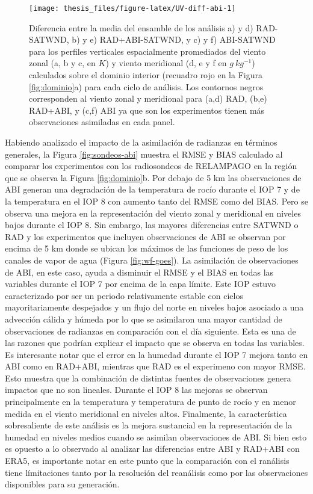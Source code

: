 \documentclass[12pt,oneside,a4paper]{reedthesis}
\begin{document}
\begin{figure}

{\centering \texttt{[image: thesis\_files/figure-latex/UV-diff-abi-1]} 

}

\caption{Diferencia entre la media del ensamble de los análisis a) y d) RAD-SATWND, b) y e) RAD+ABI-SATWND, y c) y f) ABI-SATWND para los perfiles verticales espacialmente promediados del viento zonal (a, b y c, en \(K\)) y viento meridional (d, e y f en \(g\ kg^{-1}\)) calculados sobre el dominio interior (recuadro rojo en la Figura \ref{fig:dominio}a) para cada ciclo de análisis. Los contornos negros corresponden al viento zonal y meridional para (a,d) RAD, (b,e) RAD+ABI, y (c,f) ABI ya que son los experimentos tienen más observaciones asimiladas en cada panel.}\label{fig:UV-diff-abi}
\end{figure}
Habiendo analizado el impacto de la asimilación de radianzas en términos generales, la Figura \ref{fig:sondeos-abi} muestra el RMSE y BIAS calculado al comparar los experimentos con los radiosondeos de RELAMPAGO en la región que se observa la Figura \ref{fig:dominio}b. Por debajo de 5 km las observaciones de ABI generan una degradación de la temperatura de rocío durante el IOP 7 y de la temperatura en el IOP 8 con aumento tanto del RMSE como del BIAS. Pero se observa una mejora en la representación del viento zonal y meridional en niveles bajos durante el IOP 8. Sin embargo, las mayores diferencias entre SATWND o RAD y los experimentos que incluyen observaciones de ABI se observan por encima de 5 km donde se ubican los máximos de las funciones de peso de los canales de vapor de agua (Figura \ref{fig:wf-goes}). La asimilación de observaciones de ABI, en este caso, ayuda a disminuir el RMSE y el BIAS en todas las variables durante el IOP 7 por encima de la capa límite. Este IOP estuvo caracterizado por ser un periodo relativamente estable con cielos mayoritariamente despejados y un flujo del norte en niveles bajos asociado a una advección cálida y húmeda por lo que se asimilaron una mayor cantidad de observaciones de radianzas en comparación con el día siguiente. Esta es una de las razones que podrían explicar el impacto que se observa en todas las variables. Es interesante notar que el error en la humedad durante el IOP 7 mejora tanto en ABI como en RAD+ABI, mientras que RAD es el experimeno con mayor RMSE. Esto muestra que la combinación de distintas fuentes de observaciones genera impactos que no son lineales. Durante el IOP 8 las mejoras se observan principalmente en la temperatura y temperatura de punto de rocío y en menor medida en el viento meridional en niveles altos. Finalmente, la característica sobresaliente de este análisis es la mejora sustancial en la representación de la humedad en niveles medios cuando se asimilan observaciones de ABI. Si bien esto es opuesto a lo observado al analizar las diferencias entre ABI y RAD+ABI con ERA5, es importante notar en este punto que la comparación con el ranálisis tiene límitaciones tanto por la resolución del reanálisis como por las observaciones disponibles para su generación.
\end{document}
